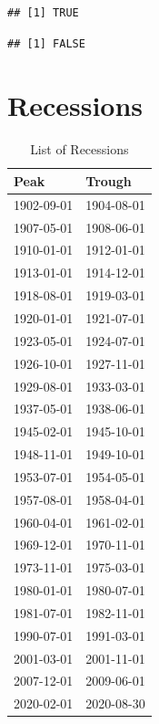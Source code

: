 \documentclass[]{book}
\begin{document}
\begin{verbatim}
## [1] TRUE
\end{verbatim}

\begin{verbatim}
## [1] FALSE
\end{verbatim}

\hypertarget{recessions}{%
\section{Recessions}\label{recessions}}

\begin{table}

\caption{\label{tab:unnamed-chunk-11}List of Recessions}
\centering
\begin{tabular}[t]{l|l}
\hline
Peak & Trough\\
\hline
1902-09-01 & 1904-08-01\\
\hline
1907-05-01 & 1908-06-01\\
\hline
1910-01-01 & 1912-01-01\\
\hline
1913-01-01 & 1914-12-01\\
\hline
1918-08-01 & 1919-03-01\\
\hline
1920-01-01 & 1921-07-01\\
\hline
1923-05-01 & 1924-07-01\\
\hline
1926-10-01 & 1927-11-01\\
\hline
1929-08-01 & 1933-03-01\\
\hline
1937-05-01 & 1938-06-01\\
\hline
1945-02-01 & 1945-10-01\\
\hline
1948-11-01 & 1949-10-01\\
\hline
1953-07-01 & 1954-05-01\\
\hline
1957-08-01 & 1958-04-01\\
\hline
1960-04-01 & 1961-02-01\\
\hline
1969-12-01 & 1970-11-01\\
\hline
1973-11-01 & 1975-03-01\\
\hline
1980-01-01 & 1980-07-01\\
\hline
1981-07-01 & 1982-11-01\\
\hline
1990-07-01 & 1991-03-01\\
\hline
2001-03-01 & 2001-11-01\\
\hline
2007-12-01 & 2009-06-01\\
\hline
2020-02-01 & 2020-08-30\\
\hline
\end{tabular}
\end{table}
\end{document}
